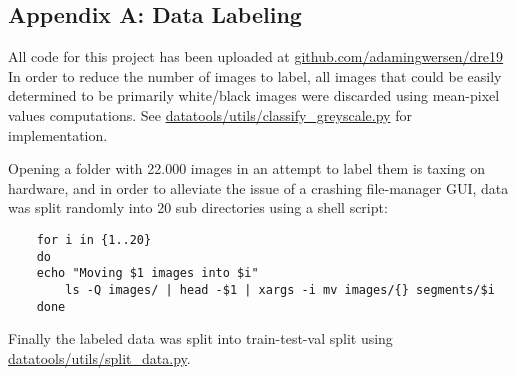 \subsection*{Appendix A: Data Labeling}\label{appendix: A}
All code for this project has been uploaded at \url{github.com/adamingwersen/dre19}
In order to reduce the number of images to label, all images that could be easily determined to be primarily white/black images were discarded using mean-pixel values computations. 
See \url{datatools/utils/classify_greyscale.py} for implementation. 

Opening a folder with 22.000 images in an attempt to label them is taxing on hardware, and in order to alleviate the issue of a crashing file-manager GUI, data was split randomly into 20 sub directories using a shell script:
\begin{verbatim}
    for i in {1..20}
    do
	echo "Moving $1 images into $i"
        ls -Q images/ | head -$1 | xargs -i mv images/{} segments/$i
    done
\end{verbatim}

Finally the labeled data was split into train-test-val split using \url{datatools/utils/split_data.py}.

